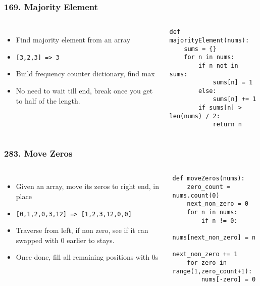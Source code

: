 \begin{frame}[fragile]\frametitle{169. Majority Element}

	\begin{columns}[T]
	\begin{itemize}
	\item Find majority element from an array
	\item \lstinline{[3,2,3] => 3}
	\item Build frequency counter dictionary, find max
	\item No need to wait till end, break once you get to half of the length.
	\end{itemize}
		\begin{lstlisting}[basicstyle=\scriptsize]
def majorityElement(nums):
    sums = {}
    for n in nums:
        if n not in sums:
            sums[n] = 1
        else:
            sums[n] += 1
        if sums[n] > len(nums) / 2:
            return n

				\end{lstlisting}		

	\end{columns}
		
\end{frame}

\begin{frame}[fragile]\frametitle{283. Move Zeros}

	\begin{columns}[T]
	\begin{itemize}
	\item Given an array, move its zeros to right end, in place
	\item \lstinline{[0,1,2,0,3,12] => [1,2,3,12,0,0]}
	\item Traverse from left, if non zero, see if it can swapped with 0 earlier to stays.
	\item Once done, fill all remaining positions with 0s
	\end{itemize}
		\begin{lstlisting}[basicstyle=\scriptsize]
def moveZeros(nums):
    zero_count = nums.count(0)
    next_non_zero = 0
    for n in nums:
        if n != 0:
            nums[next_non_zero] = n
            next_non_zero += 1
    for zero in range(1,zero_count+1):
        nums[-zero] = 0
				\end{lstlisting}		

	\end{columns}
		
\end{frame}